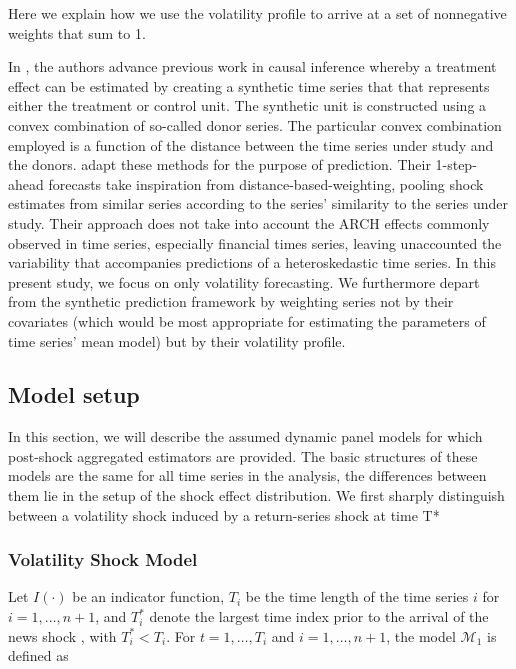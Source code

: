 \documentclass[11pt]{article}
\def\mc#1{\mathcal{#1}} %
\def\mc#1{\mathcal{#1}}
\theoremstyle{definition}
\begin{document}
Here we explain how we use the volatility profile to arrive at a set of nonnegative weights that sum to 1.

In \citet{abadie2010synthetic}, the authors advance previous work in causal inference whereby a treatment effect can be estimated by creating a synthetic time series that that represents either the treatment or control unit.  The synthetic unit is constructed using a convex combination of so-called donor series.  The particular convex combination employed is a function of the distance between the time series under study and the donors. \citet{lin2021minimizing} adapt these methods for the purpose of prediction.  Their 1-step-ahead forecasts take inspiration from distance-based-weighting, pooling shock estimates from similar series according to the series' similarity to the series under study.  Their approach does not take into account the ARCH effects commonly observed in time series, especially financial times series, leaving unaccounted the variability that accompanies predictions of a heteroskedastic time series.  In this present study, we focus on only volatility forecasting.  We furthermore depart from the synthetic prediction framework by weighting series not by their covariates (which would be most appropriate for estimating the parameters of time series' mean model) but by their volatility profile.


\subsection{Model setup}
\label{modelsetup}
In this section, we will describe the assumed dynamic panel models for which 
post-shock aggregated estimators are provided. The basic structures of these models 
are the same for all time series in the analysis, the differences between them lie in the setup of the shock effect distribution.  We first sharply distinguish between a volatility shock induced by a return-series shock at time T*


\subsubsection{Volatility Shock Model}

Let $I(\cdot)$ be an indicator function, $T_i$ be the time length of the time series $i$ for $i = 1, \ldots, n+1$, and $T_i^*$ denote the largest time index prior to the arrival of the news shock , with $T_i^* < T_i$.  For $t= 1, \ldots, T_i$ and $i = 1, \ldots, n+1$, the model $\mc{M}_1$ is defined as
\end{document}
